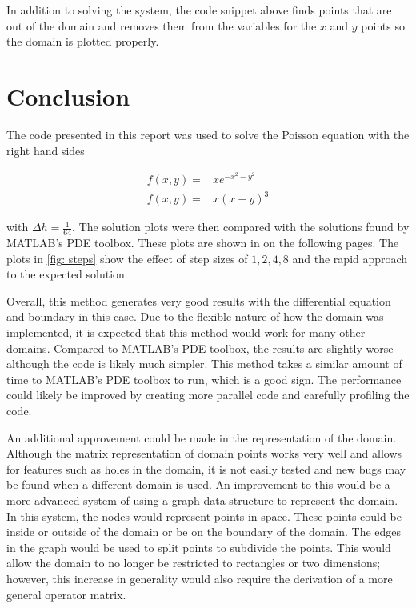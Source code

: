 \documentclass[10pt,a4paper]{article}
\begin{document}
In addition to solving the system,  the code snippet above finds points that are out of the domain and removes them from the variables for the $x$ and $y$ points so the domain is plotted properly.

\section*{Conclusion}

The code presented in this report was used to solve the Poisson equation with the right hand sides

\begin{subequations}
\begin{align}
f(x, y) =& x e^{-x^2 - y^2} \label{eqn: gaussian}\\
f(x, y) =& x \left( x - y \right)^3 \label{eqn: cubic}
\end{align}
\end{subequations}

with $\Delta h = \frac{1}{64}$. The solution plots were then compared with the solutions found by MATLAB's PDE toolbox. These plots are shown in  on the following pages. The plots in \cref{fig: steps} show the effect of step sizes of $1, 2, 4, 8$ and the rapid approach to the expected solution.



Overall, this method generates very good results with the differential equation and boundary in this case. Due to the flexible nature of how the domain was implemented, it is expected that this method would work for many other domains. Compared to MATLAB's PDE toolbox, the results are slightly worse although the code is likely much simpler. This method takes a similar amount of time to MATLAB's PDE toolbox to run, which is a good sign. The performance could likely be improved by creating more parallel code and carefully profiling the code.

An additional approvement could be made in the representation of the domain. Although the matrix representation of domain points works very well and allows for features such as holes in the domain, it is not easily tested and new bugs may be found when a different domain is used. An improvement to this would be a more advanced system of using a graph data structure to represent the domain. In this system, the nodes would represent points in space. These points could be inside or outside of the domain or be on the boundary of the domain. The edges in the graph would be used to split points to subdivide the points. This would allow the domain to no longer be restricted to rectangles or two dimensions; however, this increase in generality would also require the derivation of a more general operator matrix.
\end{document}
